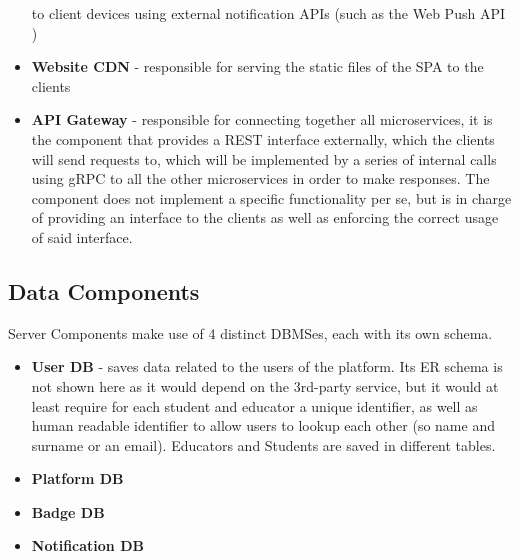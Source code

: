 \begin{itemize}
          to client devices using external notification APIs (such as the Web Push API \cite{WebPushApi})
    \item \textbf{Website CDN} {-} responsible for serving the static files of the SPA to the clients
    \item \textbf{API Gateway} {-} responsible for connecting together all microservices, it is the component that provides a REST
          interface externally, which the clients will send requests to, which will be implemented by a series of internal calls
          using gRPC \cite{gRPC} to all the other microservices in order to make responses. The component does not implement a specific
          functionality per se, but is in charge of providing an interface to the clients as well as enforcing the correct usage
          of said interface.
\end{itemize}

\subsection{Data Components}
Server Components make use of 4 distinct DBMSes, each with its own schema.
\begin{itemize}
    \item \textbf{User DB} {-} saves data related to the users of the platform. Its ER schema is not shown
          here as it would depend on the 3rd-party service, but it would at least require for each student and
          educator a unique identifier, as well as human readable identifier to allow users to lookup each other
          (so name and surname or an email). Educators and Students are saved in different tables.
          \pagebreak
    \item \textbf{Platform DB}
          \begin{adjustbox}{
                  max size={\textwidth}{},
                  caption={Platform ER},
                  label={fig:Platform ER},
                  figure=H}
              \centering
          \end{adjustbox}
          \pagebreak
    \item \textbf{Badge DB}
          \begin{adjustbox}{
                  max size={\textwidth}{},
                  caption={Badges ER},
                  label={fig:Badges ER},
                  figure=H}
              \centering
          \end{adjustbox}
    \item \textbf{Notification DB}
          \begin{adjustbox}{
                  max size={\textwidth}{},
                  caption={Notification ER},
                  label={fig:Notification ER},
                  figure=H}
              \centering
          \end{adjustbox}
\end{itemize}
\pagebreak

